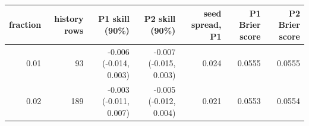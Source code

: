 \begin{tabular}{rrrrrrr}
\toprule
fraction & history rows & P1 skill (90\%) & P2 skill (90\%) & seed spread, P1 & P1 Brier score & P2 Brier score \\
\midrule
0.01 & 93 & -0.006 (-0.014, 0.003) & -0.007 (-0.015, 0.003) & 0.024 & 0.0555 & 0.0555 \\
0.02 & 189 & -0.003 (-0.011, 0.007) & -0.005 (-0.012, 0.004) & 0.021 & 0.0553 & 0.0554 \\

\end{tabular}
